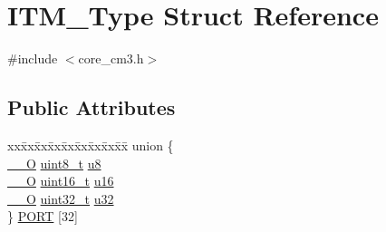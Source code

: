 \hypertarget{struct_i_t_m___type}{}\section{I\+T\+M\+\_\+\+Type Struct Reference}
\label{struct_i_t_m___type}


{\ttfamily \#include $<$core\+\_\+cm3.\+h$>$}

\subsection*{Public Attributes}
\begin{DoxyCompactItemize}
\item 
\begin{tabbing}
xx\=xx\=xx\=xx\=xx\=xx\=xx\=xx\=xx\=\kill
union \{\\
\>\hyperlink{group___c_m_s_i_s___c_m3__core__definitions_ga7e25d9380f9ef903923964322e71f2f6}{\_\_O} \hyperlink{_p_e___types_8h_aba7bc1797add20fe3efdf37ced1182c5}{uint8\_t} \hyperlink{struct_i_t_m___type_abea77b06775d325e5f6f46203f582433}{u8}\\
\>\hyperlink{group___c_m_s_i_s___c_m3__core__definitions_ga7e25d9380f9ef903923964322e71f2f6}{\_\_O} \hyperlink{_p_e___types_8h_a1f1825b69244eb3ad2c7165ddc99c956}{uint16\_t} \hyperlink{struct_i_t_m___type_a12aa4eb4d9dcb589a5d953c836f4e8f4}{u16}\\
\>\hyperlink{group___c_m_s_i_s___c_m3__core__definitions_ga7e25d9380f9ef903923964322e71f2f6}{\_\_O} \hyperlink{_p_e___types_8h_a33594304e786b158f3fb30289278f5af}{uint32\_t} \hyperlink{struct_i_t_m___type_a6882fa5af67ef5c5dfb433b3b68939df}{u32}\\
\} \hyperlink{struct_i_t_m___type_aabb85c8dcc25833f615a91c0f0682f59}{PORT} \mbox{[}32\mbox{]}\\


\end{tabbing}
\end{DoxyCompactItemize}
